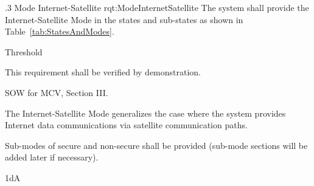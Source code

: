 \ONERQMTVKSA
{\RqtNumberBase.3}
{Mode Internet-Satellite}
{rqt:ModeInternetSatellite}
{The system shall provide the Internet-Satellite Mode in the states and sub-states as shown in Table~\ref{tab:StatesAndModes}.}
{
	\item [Phase 1] Threshold
}
{This requirement shall be verified by demonstration.}
{
	\item [\cite{ref:MCV_SOW}] SOW for MCV, Section III.
}
{
	\item The Internet-Satellite Mode generalizes the case where the system provides Internet data communications via satellite communication paths.
	\item Sub-modes of secure and non-secure shall be provided (sub-mode sections will be added later if necessary).
}
{1dA}



